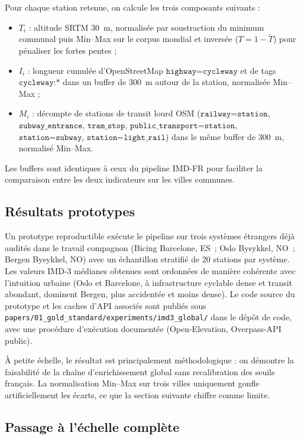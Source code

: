 \documentclass[11pt,a4paper]{article}
\begin{document}
Pour chaque station retenue, on calcule les trois composants
suivants :
\begin{itemize}[leftmargin=*]
  \item $T_i$ : altitude SRTM 30~m, normalisée par soustraction
        du minimum communal puis Min--Max sur le corpus mondial
        et inversée ($T = 1 - \widetilde{T}$) pour pénaliser les
        fortes pentes ;
  \item $I_i$ : longueur cumulée d'OpenStreetMap
        $\texttt{highway=cycleway}$ et de tags $\texttt{cycleway:*}$
        dans un buffer de 300~m autour de la station,
        normalisée Min--Max ;
  \item $M_i$ : décompte de stations de transit lourd OSM
        ($\texttt{railway=station}$, $\texttt{subway\_entrance}$,
        $\texttt{tram\_stop}$, $\texttt{public\_transport=station}$,
        $\texttt{station=subway}$, $\texttt{station=light\_rail}$)
        dans le même buffer de 300~m, normalisé Min--Max.
\end{itemize}
Les buffers sont identiques à ceux du pipeline IMD-FR pour
faciliter la comparaison entre les deux indicateurs sur les
villes communes.

\subsection{Résultats prototypes}

Un prototype reproductible exécute le pipeline sur trois
systèmes étrangers déjà audités dans le travail compagnon
(Bicing Barcelone, ES~; Oslo Bysykkel, NO~; Bergen Bysykkel,
NO) avec un échantillon stratifié de 20 stations par système.
Les valeurs IMD-3 médianes obtenues sont ordonnées de manière
cohérente avec l'intuition urbaine (Oslo et Barcelone, à
infrastructure cyclable dense et transit abondant, dominent
Bergen, plus accidentée et moins dense). Le code source du
prototype et les caches d'API associés sont publiés sous
\texttt{papers/01\_gold\_standard/experiments/imd3\_global/}
dans le dépôt de code, avec une procédure d'exécution
documentée (Open-Elevation, Overpass-API public).

À petite échelle, le résultat est principalement
méthodologique : on démontre la faisabilité de la chaîne
d'enrichissement global sans recalibration des seuils
français. La normalisation Min--Max sur trois villes
uniquement gonfle artificiellement les écarts, ce que la
section suivante chiffre comme limite.

\subsection{Passage à l'échelle complète}
\end{document}
